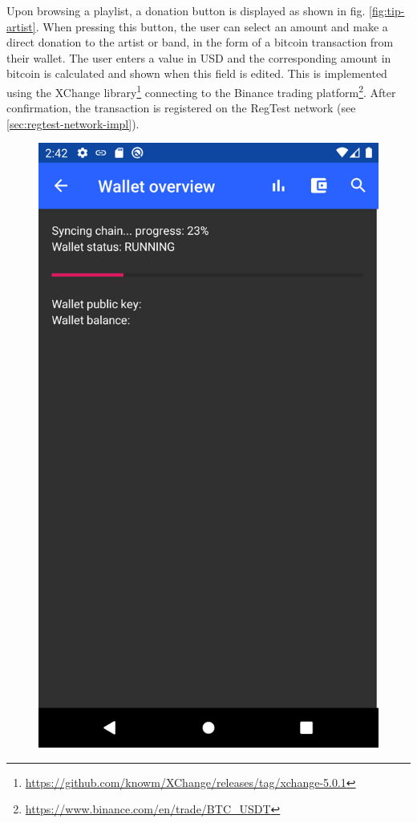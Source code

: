 Upon browsing a playlist, a donation button is displayed as shown in fig. \ref{fig:tip-artist}. When pressing this button, the user can select an amount and make a direct donation to the artist or band, in the form of a bitcoin transaction from their wallet. The user enters a value in USD and the corresponding amount in bitcoin is calculated and shown when this field is edited. This is implemented using the XChange library\footnote{\url{https://github.com/knowm/XChange/releases/tag/xchange-5.0.1}} connecting to the Binance trading platform\footnote{\url{https://www.binance.com/en/trade/BTC_USDT}}. After confirmation, the transaction is registered on the RegTest network (see \ref{sec:regtest-network-impl}). 
\begin{figure}
        \includegraphics[width=1\linewidth]{implementation/wallet-sync.png}

\end{figure}
